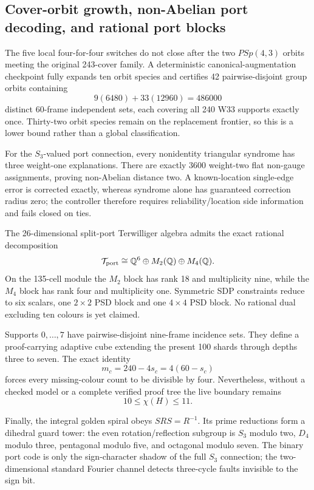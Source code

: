 \subsection{Cover-orbit growth, non-Abelian port decoding, and rational port blocks}
The five local four-for-four switches do not close after the two \(PSp(4,3)\) orbits meeting the original 243-cover family.  A deterministic canonical-augmentation checkpoint fully expands ten orbit species and certifies 42 pairwise-disjoint group orbits containing
\[
9(6480)+33(12960)=486000
\]
distinct 60-frame independent sets, each covering all 240 W33 supports exactly once.  Thirty-two orbit species remain on the replacement frontier, so this is a lower bound rather than a global classification.

For the \(S_3\)-valued port connection, every nonidentity triangular syndrome has three weight-one explanations.  There are exactly 3600 weight-two flat non-gauge assignments, proving non-Abelian distance two.  A known-location single-edge error is corrected exactly, whereas syndrome alone has guaranteed correction radius zero; the controller therefore requires reliability/location side information and fails closed on ties.

The 26-dimensional split-port Terwilliger algebra admits the exact rational decomposition
\[
\mathcal T_{\rm port}\cong\mathbb Q^6\oplus M_2(\mathbb Q)\oplus M_4(\mathbb Q).
\]
On the 135-cell module the \(M_2\) block has rank 18 and multiplicity nine, while the \(M_4\) block has rank four and multiplicity one.  Symmetric SDP constraints reduce to six scalars, one \(2\times2\) PSD block and one \(4\times4\) PSD block.  No rational dual excluding ten colours is yet claimed.

Supports \(0,\ldots,7\) have pairwise-disjoint nine-frame incidence sets.  They define a proof-carrying adaptive cube extending the present 100 shards through depths three to seven.  The exact identity
\[
m_c=240-4s_c=4(60-s_c)
\]
forces every missing-colour count to be divisible by four.  Nevertheless, without a checked model or a complete verified proof tree the live boundary remains
\[
10\leq\chi(H)\leq11.
\]

Finally, the integral golden spiral obeys \(SRS=R^{-1}\).  Its prime reductions form a dihedral guard tower: the even rotation/reflection subgroup is \(S_3\) modulo two, \(D_4\) modulo three, pentagonal modulo five, and octagonal modulo seven.  The binary port code is only the sign-character shadow of the full \(S_3\) connection; the two-dimensional standard Fourier channel detects three-cycle faults invisible to the sign bit.
